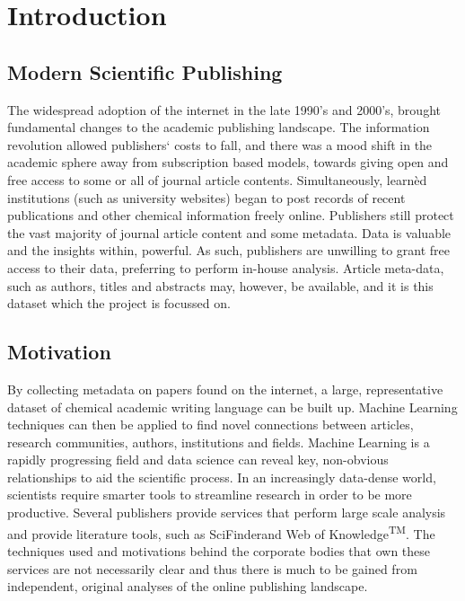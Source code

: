 \chapter{Introduction}
\section{Modern Scientific Publishing}
The widespread adoption of the internet in the late 1990’s and 2000’s, brought  fundamental changes to the academic publishing landscape. The information revolution allowed publishers` costs to fall, and there was a mood shift in the academic sphere away from subscription based models, towards giving open and free access to some or all of journal article contents.
Simultaneously, learn\`{e}d institutions (such as university websites) began to post records of recent publications and other chemical information freely online. 
Publishers still protect the vast majority of journal article content and some metadata. Data is valuable and the insights within, powerful. As such, publishers are unwilling to grant free access to their data, preferring to perform in-house analysis. Article meta-data, such as authors, titles and abstracts may, however, be available, and it is this dataset which the project is focussed on. 
\section{Motivation}
By collecting metadata on papers found on the internet, a large, representative dataset of chemical academic writing language can be built up. Machine Learning techniques can then be applied to find novel connections between articles, research communities, authors, institutions and fields. Machine Learning is a rapidly progressing field and data science can reveal key, non-obvious relationships to aid the scientific process. In an increasingly data-dense world, scientists require smarter tools to streamline research in order to be more productive. Several publishers provide services that perform large scale analysis and provide literature tools, such as SciFinder\textregistered and Web of Knowledge\textsuperscript{TM}. The techniques used and motivations behind the corporate bodies that own these services are not necessarily clear and thus there is much to be gained from independent, original analyses of the online publishing landscape. 
